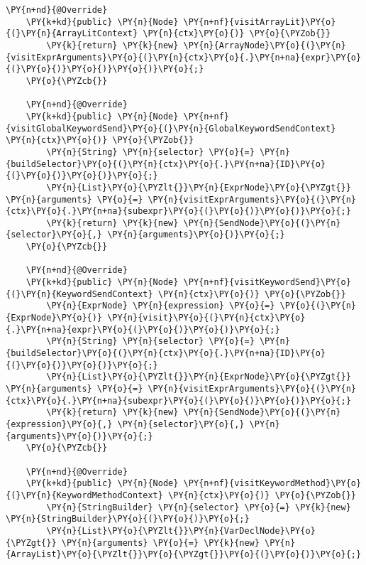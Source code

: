 \begin{Verbatim}[commandchars=\\\{\}]
    \PY{n+nd}{@Override}
    \PY{k+kd}{public} \PY{n}{Node} \PY{n+nf}{visitArrayLit}\PY{o}{(}\PY{n}{ArrayLitContext} \PY{n}{ctx}\PY{o}{)} \PY{o}{\PYZob{}}
        \PY{k}{return} \PY{k}{new} \PY{n}{ArrayNode}\PY{o}{(}\PY{n}{visitExprArguments}\PY{o}{(}\PY{n}{ctx}\PY{o}{.}\PY{n+na}{expr}\PY{o}{(}\PY{o}{)}\PY{o}{)}\PY{o}{)}\PY{o}{;}
    \PY{o}{\PYZcb{}}

    \PY{n+nd}{@Override}
    \PY{k+kd}{public} \PY{n}{Node} \PY{n+nf}{visitGlobalKeywordSend}\PY{o}{(}\PY{n}{GlobalKeywordSendContext} \PY{n}{ctx}\PY{o}{)} \PY{o}{\PYZob{}}
        \PY{n}{String} \PY{n}{selector} \PY{o}{=} \PY{n}{buildSelector}\PY{o}{(}\PY{n}{ctx}\PY{o}{.}\PY{n+na}{ID}\PY{o}{(}\PY{o}{)}\PY{o}{)}\PY{o}{;}
        \PY{n}{List}\PY{o}{\PYZlt{}}\PY{n}{ExprNode}\PY{o}{\PYZgt{}} \PY{n}{arguments} \PY{o}{=} \PY{n}{visitExprArguments}\PY{o}{(}\PY{n}{ctx}\PY{o}{.}\PY{n+na}{subexpr}\PY{o}{(}\PY{o}{)}\PY{o}{)}\PY{o}{;}
        \PY{k}{return} \PY{k}{new} \PY{n}{SendNode}\PY{o}{(}\PY{n}{selector}\PY{o}{,} \PY{n}{arguments}\PY{o}{)}\PY{o}{;}
    \PY{o}{\PYZcb{}}

    \PY{n+nd}{@Override}
    \PY{k+kd}{public} \PY{n}{Node} \PY{n+nf}{visitKeywordSend}\PY{o}{(}\PY{n}{KeywordSendContext} \PY{n}{ctx}\PY{o}{)} \PY{o}{\PYZob{}}
        \PY{n}{ExprNode} \PY{n}{expression} \PY{o}{=} \PY{o}{(}\PY{n}{ExprNode}\PY{o}{)} \PY{n}{visit}\PY{o}{(}\PY{n}{ctx}\PY{o}{.}\PY{n+na}{expr}\PY{o}{(}\PY{o}{)}\PY{o}{)}\PY{o}{;}
        \PY{n}{String} \PY{n}{selector} \PY{o}{=} \PY{n}{buildSelector}\PY{o}{(}\PY{n}{ctx}\PY{o}{.}\PY{n+na}{ID}\PY{o}{(}\PY{o}{)}\PY{o}{)}\PY{o}{;}
        \PY{n}{List}\PY{o}{\PYZlt{}}\PY{n}{ExprNode}\PY{o}{\PYZgt{}} \PY{n}{arguments} \PY{o}{=} \PY{n}{visitExprArguments}\PY{o}{(}\PY{n}{ctx}\PY{o}{.}\PY{n+na}{subexpr}\PY{o}{(}\PY{o}{)}\PY{o}{)}\PY{o}{;}
        \PY{k}{return} \PY{k}{new} \PY{n}{SendNode}\PY{o}{(}\PY{n}{expression}\PY{o}{,} \PY{n}{selector}\PY{o}{,} \PY{n}{arguments}\PY{o}{)}\PY{o}{;}
    \PY{o}{\PYZcb{}}

    \PY{n+nd}{@Override}
    \PY{k+kd}{public} \PY{n}{Node} \PY{n+nf}{visitKeywordMethod}\PY{o}{(}\PY{n}{KeywordMethodContext} \PY{n}{ctx}\PY{o}{)} \PY{o}{\PYZob{}}
        \PY{n}{StringBuilder} \PY{n}{selector} \PY{o}{=} \PY{k}{new} \PY{n}{StringBuilder}\PY{o}{(}\PY{o}{)}\PY{o}{;}
        \PY{n}{List}\PY{o}{\PYZlt{}}\PY{n}{VarDeclNode}\PY{o}{\PYZgt{}} \PY{n}{arguments} \PY{o}{=} \PY{k}{new} \PY{n}{ArrayList}\PY{o}{\PYZlt{}}\PY{o}{\PYZgt{}}\PY{o}{(}\PY{o}{)}\PY{o}{;}


\end{Verbatim}
